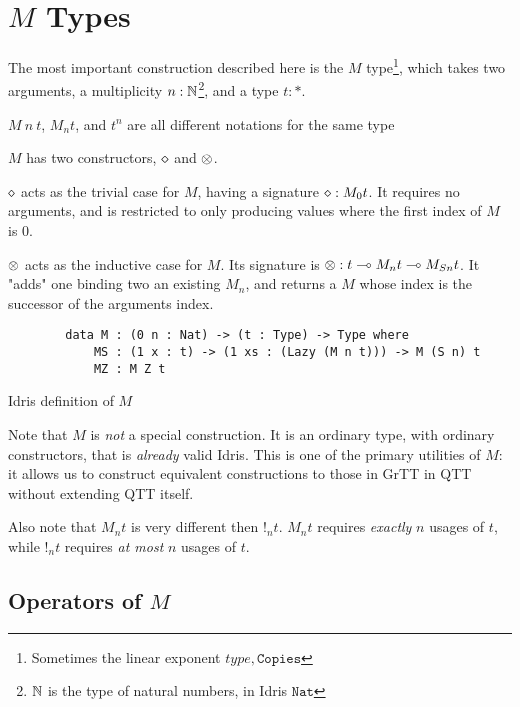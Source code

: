 \section{$M$ Types}

The most important construction described here is the $M$ type\footnote{Sometimes the linear exponent $type, \texttt{Copies}$}, which takes two arguments, a multiplicity $n : \mathbb{N}$\footnote{$\mathbb{N}$ is the type of natural numbers, in Idris $\texttt{Nat}$}, and a type $t : \ast$\cite{idris_prelude}.

\begin{note}
	$M \ n \ t$, $M_n t$, and $t^n$ are all different notations for the same type
\end{note}

\begin{definition}
	$M$ has two constructors, $\diamond$ and $\otimes$.
	
	$\diamond$ acts as the trivial case for $M$, having a signature $\diamond : M_0 t$.
	It requires no arguments, and is restricted to only producing values where the first index of $M$ is $0$.
	
	$\otimes$ acts as the inductive case for $M$.
	Its signature is $\otimes : t \multimap M_n t \multimap M_{S n} t$.
	It "adds" one binding two an existing $M_n$, and returns a $M$ whose index is the successor of the arguments index. 
\end{definition}

\begin{listing}
	\begin{verbatim}
		data M : (0 n : Nat) -> (t : Type) -> Type where
			MS : (1 x : t) -> (1 xs : (Lazy (M n t))) -> M (S n) t
			MZ : M Z t
	\end{verbatim}
	\caption{Idris definition of $M$}
\end{listing}
Note that $M$ is \emph{not} a special construction.
It is an ordinary type, with ordinary constructors, that is \emph{already} valid Idris.
This is one of the primary utilities of $M$: it allows us to construct equivalent constructions to those in GrTT in QTT without extending QTT itself.

Also note that $M_n t$ is very different then $!_n t$. 
$M_n t$ requires \emph{exactly} $n$ usages of $t$, while $!_n t$ requires \emph{at most} $n$ usages of $t$. \cite{linear_exponent}

\subsection{Operators of $M$}


